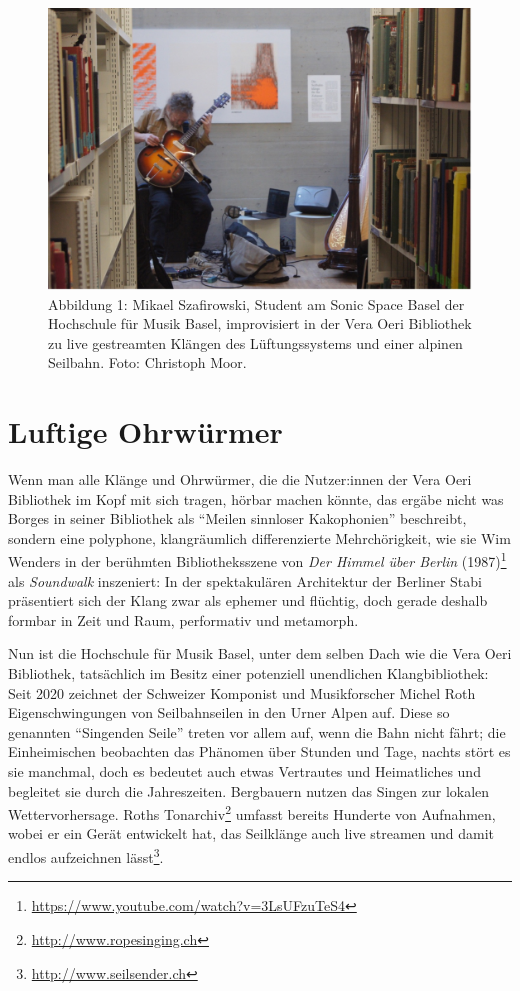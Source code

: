 \documentclass[a4paper,
fontsize=11pt,
oneside,
numbers=noperiodatend,
parskip=half-,
bibliography=totoc,
final
]{scrartcl}
\begin{document}
\begin{figure}
\centering
\includegraphics{img/Abb1.jpg}
\caption{Abbildung 1: Mikael Szafirowski, Student am Sonic Space Basel
der Hochschule für Musik Basel, improvisiert in der Vera Oeri Bibliothek
zu live gestreamten Klängen des Lüftungssystems und einer alpinen
Seilbahn. Foto: Christoph Moor.}
\end{figure}

\hypertarget{luftige-ohrwuxfcrmer}{%
\section{Luftige Ohrwürmer}\label{luftige-ohrwuxfcrmer}}

Wenn man alle Klänge und Ohrwürmer, die die Nutzer:innen der Vera Oeri
Bibliothek im Kopf mit sich tragen, hörbar machen könnte, das ergäbe
nicht was Borges in seiner Bibliothek als \enquote{Meilen sinnloser
Kakophonien} beschreibt, sondern eine polyphone, klangräumlich
differenzierte Mehrchörigkeit, wie sie Wim Wenders in der berühmten
Bibliotheksszene von \emph{Der Himmel über Berlin} (1987)\footnote{\url{https://www.youtube.com/watch?v=3LsUFzuTeS4}}
als \emph{Soundwalk} inszeniert: In der spektakulären Architektur der
Berliner Stabi präsentiert sich der Klang zwar als ephemer und flüchtig,
doch gerade deshalb formbar in Zeit und Raum, performativ und metamorph.

Nun ist die Hochschule für Musik Basel, unter dem selben Dach wie die
Vera Oeri Bibliothek, tatsächlich im Besitz einer potenziell unendlichen
Klangbibliothek: Seit 2020 zeichnet der Schweizer Komponist und
Musikforscher Michel Roth Eigenschwingungen von Seilbahnseilen in den
Urner Alpen auf. Diese so genannten \enquote{Singenden Seile} treten vor
allem auf, wenn die Bahn nicht fährt; die Einheimischen beobachten das
Phänomen über Stunden und Tage, nachts stört es sie manchmal, doch es
bedeutet auch etwas Vertrautes und Heimatliches und begleitet sie durch
die Jahreszeiten. Bergbauern nutzen das Singen zur lokalen
Wettervorhersage. Roths Tonarchiv\footnote{\url{http://www.ropesinging.ch}}
umfasst bereits Hunderte von Aufnahmen, wobei er ein Gerät entwickelt
hat, das Seilklänge auch live streamen und damit endlos aufzeichnen
lässt\footnote{\url{http://www.seilsender.ch}}.
\end{document}
